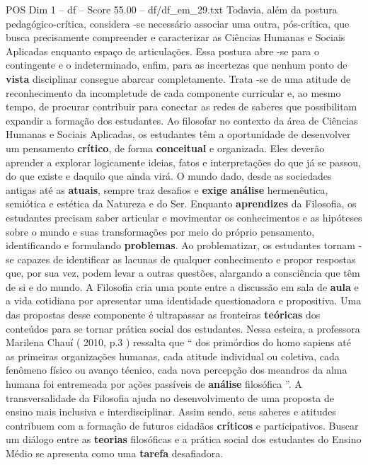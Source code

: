 \begin{textsample}{POS Dim 1 – df – Score 55.00 – df/df\_em\_29.txt}
Todavia, além da postura pedagógico-crítica, considera -se necessário associar uma outra, pós-crítica, que busca precisamente compreender e caracterizar as Ciências Humanas e Sociais Aplicadas enquanto espaço de articulações.
Essa postura abre -se para o contingente e o indeterminado, enfim, para as incertezas que nenhum ponto de \textbf{vista} disciplinar consegue abarcar completamente.
Trata -se de uma atitude de reconhecimento da incompletude de cada componente curricular e, ao mesmo tempo, de procurar contribuir para conectar as redes de saberes que possibilitam expandir a formação dos estudantes.
Ao filosofar no contexto da área de Ciências Humanas e Sociais Aplicadas, os estudantes têm a oportunidade de desenvolver um pensamento \textbf{crítico}, de forma \textbf{conceitual} e organizada.
Eles deverão aprender a explorar logicamente ideias, fatos e interpretações do que já se passou, do que existe e daquilo que ainda virá.
O mundo dado, desde as sociedades antigas até as \textbf{atuais}, sempre traz desafios e \textbf{exige} \textbf{análise} hermenêutica, semiótica e estética da Natureza e do Ser.
Enquanto \textbf{aprendizes} da Filosofia, os estudantes precisam saber articular e movimentar os conhecimentos e as hipóteses sobre o mundo e suas transformações por meio do próprio pensamento, identificando e formulando \textbf{problemas}.
Ao problematizar, os estudantes tornam -se capazes de identificar as lacunas de qualquer conhecimento e propor respostas que, por sua vez, podem levar a outras questões, alargando a consciência que têm de si e do mundo.
A Filosofia cria uma ponte entre a discussão em sala de \textbf{aula} e a vida cotidiana por apresentar uma identidade questionadora e propositiva.
Uma das propostas desse componente é ultrapassar as fronteiras \textbf{teóricas} dos conteúdos para se tornar prática social dos estudantes.
Nessa esteira, a professora Marilena Chauí ( 2010, p.3 ) ressalta que “ dos primórdios do homo sapiens até as primeiras organizações humanas, cada atitude individual ou coletiva, cada fenômeno físico ou avanço técnico, cada nova percepção dos meandros da alma humana foi entremeada por ações passíveis de \textbf{análise} filosófica ”.
A transversalidade da Filosofia ajuda no desenvolvimento de uma proposta de ensino mais inclusiva e interdisciplinar.
Assim sendo, seus saberes e atitudes contribuem com a formação de futuros cidadãos \textbf{críticos} e participativos.
Buscar um diálogo entre as \textbf{teorias} filosóficas e a prática social dos estudantes do Ensino Médio se apresenta como uma \textbf{tarefa} desafiadora.

\end{textsample}
